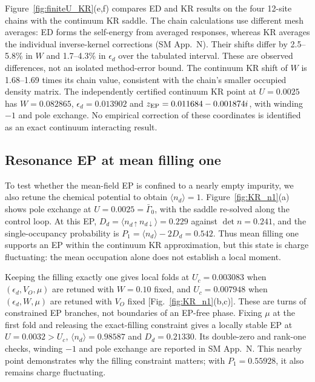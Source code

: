 \documentclass[%
  aps,physrev,onecolumn,10pt,amsmath,amssymb,superscriptaddress,longbibliography,floatfix
]{revtex4-2}
\begin{document}
Figure~\ref{fig:finiteU_KR}(e,f) compares ED and KR results on the
four 12-site chains with the continuum KR saddle.  The chain calculations
use different mesh averages: ED forms the self-energy from averaged
responses, whereas KR averages the individual inverse-kernel corrections
(SM App.~N).  Their shifts differ by 2.5--5.8\% in $W$ and 1.7--4.3\% in
$\epsilon_d$ over the tabulated interval.  These are observed differences,
not an isolated method-error bound.  The continuum KR shift of $W$ is
1.68--1.69 times its chain value, consistent with the chain's smaller
occupied density matrix.  The independently certified continuum KR point at
$U=0.0025$ has $W=0.082865$, $\epsilon_d=0.013902$ and
$z_{\rm EP}=0.011684-0.001874i$, with winding $-1$ and pole exchange.
No empirical correction of these coordinates is identified as an exact
continuum interacting result.





\subsection{Resonance EP at mean filling one}
\label{sec:KR_n1}

To test whether the mean-field EP is confined to a nearly empty impurity, we
also retune the chemical potential to obtain $\langle n_d\rangle=1$.
Figure~\ref{fig:KR_n1}(a) shows pole exchange at $U=0.0025=\bar\Gamma_0$,
with the saddle re-solved along the control loop.  At this EP,
$D_d=\langle n_{d\uparrow}n_{d\downarrow}\rangle=0.229$ against
$\det n=0.241$, and the single-occupancy probability is
$P_1=\langle n_d\rangle-2D_d=0.542$.  Thus mean filling one supports an EP
within the continuum KR approximation, but this state is charge fluctuating:
the mean occupation alone does not establish a local moment.

Keeping the filling exactly one gives local folds at
$U_c=0.003083$ when $(\epsilon_d,V_O,\mu)$ are retuned with $W=0.10$ fixed,
and $U_c=0.007948$ when $(\epsilon_d,W,\mu)$ are retuned with $V_O$ fixed
[Fig.~\ref{fig:KR_n1}(b,c)].  These are turns of constrained EP branches,
not boundaries of an EP-free phase.  Fixing $\mu$ at the first fold and
releasing the exact-filling constraint gives a locally stable EP at $U=0.0032>U_c$, $\langle n_d\rangle=0.98587$ and $D_d=0.21330$.
Its double-zero and rank-one checks, winding $-1$ and pole exchange are
reported in SM App.~N.  This nearby point demonstrates why the filling
constraint matters; with $P_1=0.55928$, it also remains charge fluctuating.
\end{document}
